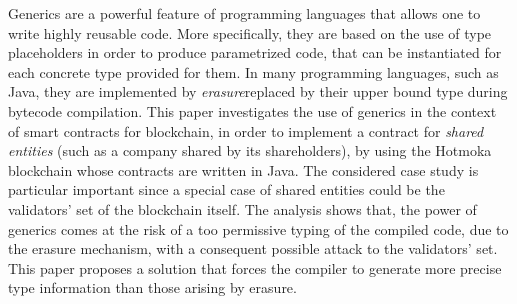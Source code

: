 Generics are a powerful feature of programming languages that allows one
to write highly reusable code.
%
More specifically, they are based on the use of type placeholders in order
to produce parametrized code, that can be instantiated for each
concrete type provided for them. 
%
In many programming languages, such as Java, they are implemented by
\emph{erasure}\ie replaced by their upper bound type during bytecode compilation.
%
This paper investigates the use of generics in the
context of smart contracts for blockchain, in order to implement
a contract for \emph{shared entities} (such as a company shared
by its shareholders),
by using the Hotmoka blockchain whose contracts are written in Java.
%
The considered case study is particular important since
a special case of shared entities could be the validators' set of
the blockchain itself. The analysis shows that, the power of generics comes at the risk of a too permissive
typing of the compiled code, due to the erasure mechanism, with a consequent possible attack
to the validators' set. This paper proposes a solution
that forces the compiler to generate more precise type information than
those arising by erasure.
